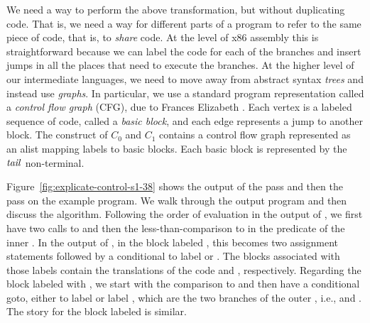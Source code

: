 \documentclass[11pt]{book}
\begin{document}
We need a way to perform the above transformation, but without
duplicating code. That is, we need a way for different parts of a
program to refer to the same piece of code, that is, to \emph{share}
code. At the level of x86 assembly this is straightforward because we
can label the code for each of the branches and insert jumps in all
the places that need to execute the branches. At the higher level of
our intermediate languages, we need to move away from abstract syntax
\emph{trees} and instead use \emph{graphs}. In particular, we use a
standard program representation called a \emph{control flow graph}
(CFG), due to Frances Elizabeth \citet{Allen:1970uq}.
 Each vertex is a labeled sequence of code,
called a \emph{basic block}, and each edge represents a jump to
another block. The  construct of $C_0$ and $C_1$ contains
a control flow graph represented as an alist mapping labels to basic
blocks. Each basic block is represented by the $\mathit{tail}$ non-terminal.

Figure~\ref{fig:explicate-control-s1-38} shows the output of the
 pass and then the
 pass on the example program. We walk through
the output program and then discuss the algorithm.
%
Following the order of evaluation in the output of
, we first have two calls to 
and then the less-than-comparison to  in the predicate of the
inner .  In the output of , in the
block labeled , this becomes two assignment statements
followed by a conditional  to label  or
. The blocks associated with those labels contain the
translations of the code  and ,
respectively. Regarding the block labeled with , we
start with the comparison to  and then have a conditional
goto, either to label  or label , which
are the two branches of the outer , i.e.,  and
. The story for the block labeled  is
similar.
\end{document}
